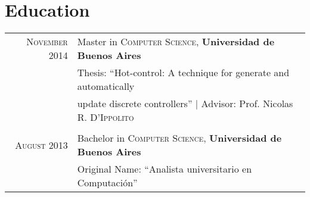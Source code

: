 \section{Education}
\begin{tabular}{rl} 
\textsc{November} 2014 & Master in \textsc{Computer Science}, \textbf{Universidad de Buenos Aires}\\
 & Thesis: ``Hot-control: A technique for generate and automatically \\
 & update discrete controllers'' | \small Advisor:  Prof. Nicolas R. \textsc{D'Ippolito}\\
 &\\

\textsc{August} 2013 & Bachelor in \textsc{Computer Science}, \textbf{Universidad de Buenos Aires} \\
 & Original Name: ``Analista universitario en Computación''\\

\end{tabular}


